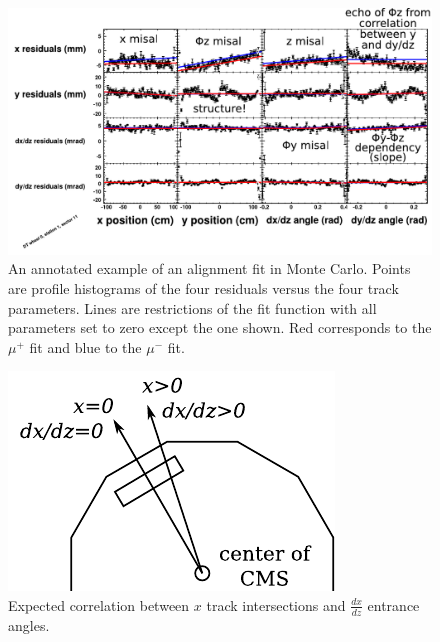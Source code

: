 \documentclass[12pt]{article}
\begin{document}
\begin{figure}
\includegraphics[width=\linewidth]{mcfit_misal_and_nongeom.pdf}
\caption{An annotated example of an alignment fit in Monte Carlo.
  Points are profile histograms of the four residuals versus the four
  track parameters.  Lines are restrictions of the fit function with
  all parameters set to zero except the one shown.  Red corresponds to
  the $\mu^+$ fit and blue to the $\mu^-$
  fit. \label{fig:mcfit_misal_and_nongeom}}
\end{figure}

\begin{figure}
\begin{center}
\includegraphics{trackangle_correlation.pdf}
\end{center}
\caption{Expected correlation between $x$ track intersections and
  $\frac{dx}{dz}$ entrance angles. \label{fig:trackangle_correlation}}
\end{figure}
\end{document}
